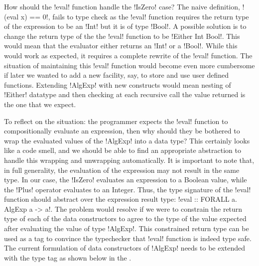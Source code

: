\documentclass[screen,nonacm]{acmart}
\begin{document}
How should the !eval! function handle the !IsZero! case? The naive
definition, !(eval x) == 0!, fails to type check as the !eval!
function requires the return type of the expression to be an !Int! but
it is of type !Bool!. A possible solution is to change the return type
of the the !eval! function to be !Either Int Bool!. This would mean
that the evaluator either returns an !Int! or a !Bool!. While this would work as
expected, it requires a complete rewrite of the !eval! function. The
situation of maintaining this !eval! function would become even more
cumbersome if later we wanted to add a new facility, say, to store and use user
defined functions. Extending !AlgExp! with new constructs would mean
nesting of !Either! datatype and then checking at each recursive
call the value returned is the one that we expect.

To reflect on the situation: the programmer
expects the !eval! function to compositionally evaluate an
expression, then why should they be bothered to wrap the
evaluated values of the !AlgExp! into a data type? This certainly
looks like a code smell, and we should be able to find an appropriate
abstraction to handle this wrapping and unwrapping automatically.
It is important to note that, in full generality, the evaluation of the expression
may not result in the same type. In our case, the !IsZero! evaluates
an expression to a Boolean value, while the !Plus! operator evaluates
to an Integer. Thus, the type signature of the !eval! function should
abstract over the expression result type:
!eval :: FORALL a. AlgExp a -> a!. The problem
would resolve if we were to constrain the return type of each of the
data constructors to agree to the type of the value expected after
evaluating the value of type !AlgExp!. This constrained return type
can be used as a tag to convince the typechecker that !eval! function
is indeed type safe. The current formulation of data
constructors of !AlgExp! needs to be extended with the type tag
as shown below in the .
\end{document}

